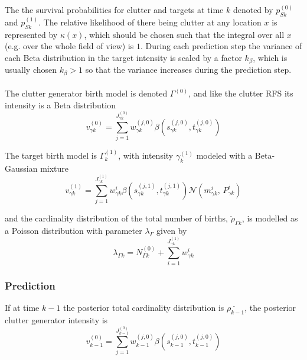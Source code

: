 \documentclass{article}
\newcommand{\clut}{{(0)}}
\newcommand{\tgt}{{(1)}}
\begin{document}
The the survival probabilities for clutter and targets at time $k$ denoted by $p_{Sk}^{(0)}$ and $p_{Sk}^{(1)}$. The relative likelihood of there being clutter at any location $x$ is represented by $\kappa(x)$, which should be chosen such that the integral over all $x$ (e.g. over the whole field of view) is $1$. During each prediction step the variance of each Beta distribution in the target intensity is scaled by a factor $k_{\beta}$, which is usually chosen $k_{\beta} > 1$ so that the variance increases during the prediction step.\\
\\
The clutter generator birth model is denoted $\Gamma^{(0)}$, and like the clutter RFS its intensity is a Beta distribution
\begin{equation}
  \label{eq:lpd_clutter_birth}
  v_{\gamma k}^\clut = \sum_{j=1}^{J^\clut _{\gamma k}}w_{\gamma k}^{(j, 0)}\beta(s_{\gamma k}^{(j, 0)}, t_{\gamma k}^{(j, 0)})
\end{equation}

The target birth model is $\Gamma^{(1)}_k$, with intensity $\gamma^{(1)}_k$ modeled with a Beta-Gaussian mixture
\begin{equation}
  \label{eq:lpd_tgt_birth}
    v_{\gamma k}^\tgt = \sum_{j=1}^{J^\tgt _{\gamma k}}w_{\gamma k}^i \beta(s_{\gamma k}^{(j, 1)}, t_{\gamma k}^{(j, 1)})\mathcal{N}(m_{\gamma k}^i,\,P_{\gamma k}^i)
\end{equation}

and the cardinality distribution of the total number of births, $\ddot{\rho}_{\Gamma k}$, is modelled as a Poisson distribution with parameter $\lambda_\Gamma$ given by
\begin{equation}
  \label{eq:lpd_rho_gamma}
\lambda_{\Gamma k} = N_{\Gamma k}^{(0)} + \sum_{i=1}^{J_{\gamma k}^{(1)}}w_{\gamma k}^i 
\end{equation}

\subsubsection{Prediction}

If at time $k-1$ the posterior total cardinality distribution is $\ddot{\rho_{k-1}}$, the posterior clutter generator intensity is \cite{cphd}
\begin{equation}
  \label{eq:lpd_v0k-1}
  v_{k-1}^\clut = \sum_{j=1}^{J^\clut _{k-1}}w_{k-1}^{(j, 0)}\beta(s_{k-1}^{(j, 0)}, t_{k-1}^{(j, 0)})
\end{equation}
\end{document}
